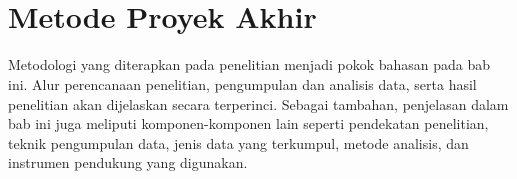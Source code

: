 \chapter[Metode Proyek Akhir]{\\ Metode Proyek Akhir}
Metodologi yang diterapkan pada penelitian menjadi pokok bahasan pada bab ini. Alur perencanaan penelitian, pengumpulan dan analisis data, serta hasil penelitian akan dijelaskan secara terperinci. Sebagai tambahan, penjelasan dalam bab ini juga meliputi komponen-komponen lain seperti pendekatan penelitian, teknik pengumpulan data, jenis data yang terkumpul, metode analisis, dan instrumen pendukung yang digunakan.







